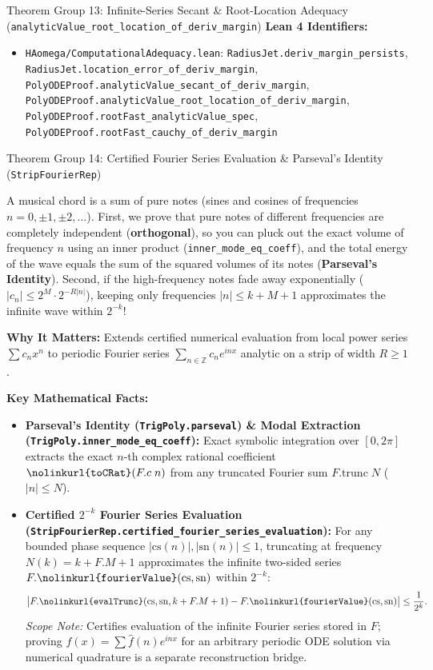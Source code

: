 \documentclass[11pt,a4paper]{article}
\newcommand{\Z}{\ensuremath{\mathbb{Z}}}
\newcommand{\lean}[1]{\texttt{\nolinkurl{#1}}}
\begin{document}
\begin{thmcard}{Theorem Group 13: Infinite-Series Secant \& Root-Location Adequacy (\lean{analyticValue\_root\_location\_of\_deriv\_margin})}
\textbf{Lean 4 Identifiers:}
\begin{itemize}
  \item \lean{HAomega/ComputationalAdequacy.lean}: \lean{RadiusJet.deriv_margin_persists}, \lean{RadiusJet.location_error_of_deriv_margin}, \lean{PolyODEProof.analyticValue_secant_of_deriv_margin}, \lean{PolyODEProof.analyticValue_root_location_of_deriv_margin}, \lean{PolyODEProof.rootFast_analyticValue_spec}, \lean{PolyODEProof.rootFast_cauchy_of_deriv_margin}
\end{itemize}
\end{thmcard}

\vspace{6pt}

\begin{thmcard}{Theorem Group 14: Certified Fourier Series Evaluation \& Parseval's Identity (\lean{StripFourierRep})}
\begin{eli5box}
A musical chord is a sum of pure notes (sines and cosines of frequencies $n = 0, \pm 1, \pm 2, \dots$). First, we prove that pure notes of different frequencies are completely independent (\textbf{orthogonal}), so you can pluck out the exact volume of frequency $n$ using an inner product (\lean{inner_mode_eq_coeff}), and the total energy of the wave equals the sum of the squared volumes of its notes (\textbf{Parseval's Identity}). Second, if the high-frequency notes fade away exponentially ($|c_n| \le 2^M \cdot 2^{-R|n|}$), keeping only frequencies $|n| \le k + M + 1$ approximates the infinite wave within $2^{-k}$!
\end{eli5box}

\textbf{Why It Matters:}
Extends certified numerical evaluation from local power series $\sum c_n x^n$ to periodic Fourier series $\sum_{n \in \Z} c_n e^{inx}$ analytic on a strip of width $R \ge 1$.

\textbf{Key Mathematical Facts:}
\begin{itemize}
  \item \textbf{Parseval's Identity (\lean{TrigPoly.parseval}) \& Modal Extraction (\lean{TrigPoly.inner_mode_eq_coeff}):} Exact symbolic integration over $[0, 2\pi]$ extracts the exact $n$-th complex rational coefficient $\lean{toCRat}(F.c\;n)$ from any truncated Fourier sum $F.\mathrm{trunc}\;N$ ($|n| \le N$).
  \item \textbf{Certified $2^{-k}$ Fourier Series Evaluation (\lean{StripFourierRep.certified_fourier_series_evaluation}):} For any bounded phase sequence $|\mathrm{cs}(n)|, |\mathrm{sn}(n)| \le 1$, truncating at frequency $N(k) = k + F.M + 1$ approximates the infinite two-sided series $F.\lean{fourierValue}(\mathrm{cs}, \mathrm{sn})$ within $2^{-k}$:
  \[
    \bigl|F.\lean{evalTrunc}(\mathrm{cs}, \mathrm{sn}, k + F.M + 1) - F.\lean{fourierValue}(\mathrm{cs}, \mathrm{sn})\bigr| \le \frac{1}{2^k}.
  \]
  \emph{Scope Note:} Certifies evaluation of the infinite Fourier series stored in $F$; proving $f(x) = \sum \widehat{f}(n)e^{inx}$ for an arbitrary periodic ODE solution via numerical quadrature is a separate reconstruction bridge.
\end{itemize}


\end{thmcard}
\end{document}
